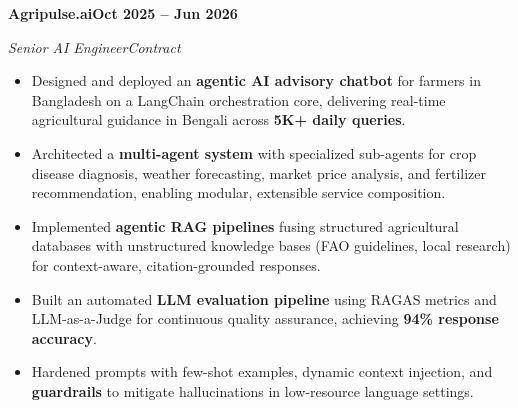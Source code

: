 \documentclass[10pt,a4paper]{article}
\begin{document}
\vspace{0.25em}
\noindent\textbf{Agripulse.ai}\hfill\textbf{Oct 2025 -- Jun 2026}\par
\textit{Senior AI Engineer}\hfill\textit{Contract}\par
\vspace{0.2em}
\begin{itemize}
  \item Designed and deployed an \textbf{agentic AI advisory chatbot} for farmers in Bangladesh on a LangChain orchestration core, delivering real-time agricultural guidance in Bengali across \textbf{5K+ daily queries}.
  \item Architected a \textbf{multi-agent system} with specialized sub-agents for crop disease diagnosis, weather forecasting, market price analysis, and fertilizer recommendation, enabling modular, extensible service composition.
  \item Implemented \textbf{agentic RAG pipelines} fusing structured agricultural databases with unstructured knowledge bases (FAO guidelines, local research) for context-aware, citation-grounded responses.
  \item Built an automated \textbf{LLM evaluation pipeline} using RAGAS metrics and LLM-as-a-Judge for continuous quality assurance, achieving \textbf{94\% response accuracy}.
  \item Hardened prompts with few-shot examples, dynamic context injection, and \textbf{guardrails} to mitigate hallucinations in low-resource language settings.
\end{itemize}
\end{document}

